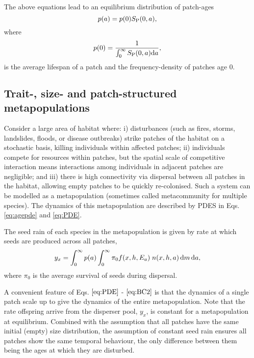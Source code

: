 \documentclass[10pt,twoside]{article}
\begin{document}
The above equations lead to an equilibrium distribution of patch-ages
\begin{equation} p(a) = p(0) S_{\rm P} (0,a),
\end{equation}
where
\begin{equation}
  p(0) = \frac1{\int_0^\infty S_{\rm P} (0,a) {\rm d}a},
\end{equation}
is the average lifespan of a patch and the frequency-density of patches
age \(0\).

\subsection{Trait-, size- and patch-structured
metapopulations}\label{trait--size--and-patch-structured-metapopulations}

Consider a large area of habitat where: i) disturbances (such as fires,
storms, landslides, floods, or disease outbreaks) strike patches of the
habitat on a stochastic basis, killing individuals within affected
patches; ii) individuals compete for resources within patches, but the
spatial scale of competitive interaction means interactions among
individuals in adjacent patches are negligible; and iii) there is high
connectivity via dispersal between all patches in the habitat, allowing
empty patches to be quickly re-colonised. Such a system can be modelled
as a metapopulation (sometimes called metacommunity for multiple
species). The dynamics of this metapopulation are described by PDES in
Eqs. \ref{eq:agepde} and \ref{eq:PDE}.

The seed rain of each species in the metapopulation is given by rate at
which seeds are produced across all patches,
\begin{equation}  \label{eq:seed_rain} 
  y_x = \int_0^{\infty} p(a)  \int_0^{\infty}  \pi_0 f(x,h,E_a) \; n(x,h,a)\,{\rm d} m \, {\rm d} a,
\end{equation}
where \(\pi_0\) is the average survival of seeds during dispersal.

A convenient feature of Eqs. \(\ref{eq:PDE}\) - \(\ref{eq:BC2}\) is that
the dynamics of a single patch scale up to give the dynamics of the
entire metapopulation. Note that the rate offspring arrive from the
disperser pool, \(y_x\), is constant for a metapopulation at
equilibrium. Combined with the assumption that all patches have the same
initial (empty) size distribution, the assumption of constant seed rain
ensures all patches show the same temporal behaviour, the only
difference between them being the ages at which they are disturbed.
\end{document}
